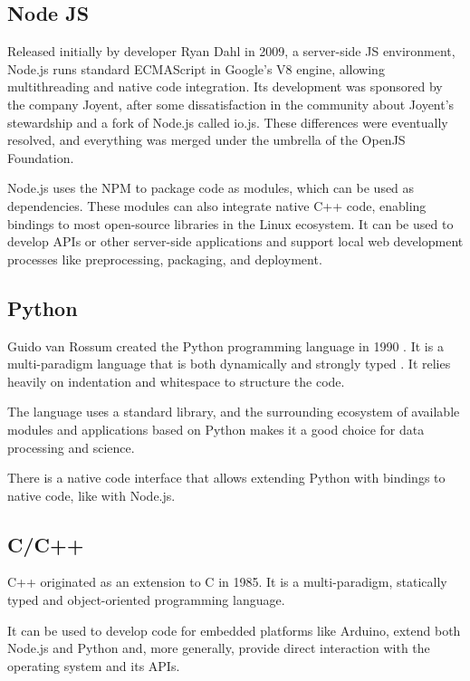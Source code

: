 \subsection{Node JS}

Released initially by developer Ryan Dahl in 2009, a server-side \ac{JS} environment, Node.js runs standard ECMAScript in Google's V8 engine, allowing multithreading and native code integration. Its development was sponsored by the company Joyent, after some dissatisfaction in the community about Joyent's stewardship and a fork of Node.js called io.js. These differences were eventually resolved, and everything was merged under the umbrella of the OpenJS Foundation. 

Node.js uses the \ac{NPM} to package code as modules, which can be used as dependencies. These modules can also integrate native C++ code, enabling bindings to most open-source libraries in the Linux ecosystem. It can be used to develop \ac{API}s or other server-side applications and support local web development processes like preprocessing, packaging, and deployment. 

\subsection{Python}

Guido van Rossum created the Python programming language in 1990 \parencite{pythonHistory}. It is a multi-paradigm language that is both dynamically and strongly typed \parencite{pythonTyping}. It relies heavily on indentation and whitespace to structure the code.

The language uses a standard library, and the surrounding ecosystem of available modules and applications based on Python makes it a good choice for data processing and science.

There is a native code interface that allows extending Python with bindings to native code, like with Node.js.

\subsection{C/C++}

C++ originated as an extension to C in 1985. It is a multi-paradigm, statically typed and object-oriented programming language.

It can be used to develop code for embedded platforms like Arduino, extend both Node.js and Python and, more generally, provide direct interaction with the operating system and its APIs.


